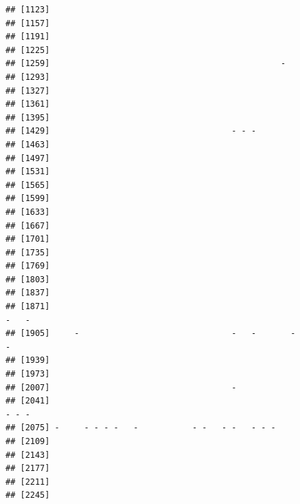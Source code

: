 \documentclass[]{article}
\begin{document}
\begin{verbatim}
## [1123]                                                                    
## [1157]                                                                    
## [1191]                                                                    
## [1225]                                                                    
## [1259]                                               -                    
## [1293]                                                                    
## [1327]                                                                    
## [1361]                                                                    
## [1395]                                                                    
## [1429]                                     - - -                          
## [1463]                                                                    
## [1497]                                                                    
## [1531]                                                                    
## [1565]                                                                    
## [1599]                                                                    
## [1633]                                                                    
## [1667]                                                                    
## [1701]                                                                    
## [1735]                                                                    
## [1769]                                                                    
## [1803]                                                                    
## [1837]                                                                    
## [1871]                                                             -   -  
## [1905]     -                               -   -       -           -      
## [1939]                                                                    
## [1973]                                                                    
## [2007]                                     -                              
## [2041]                                                               - - -
## [2075] -     - - - -   -           - -   - -   - - -                      
## [2109]                                                                    
## [2143]                                                                    
## [2177]                                                                    
## [2211]                                                                    
## [2245]                                                                    

\end{verbatim}
\end{document}
